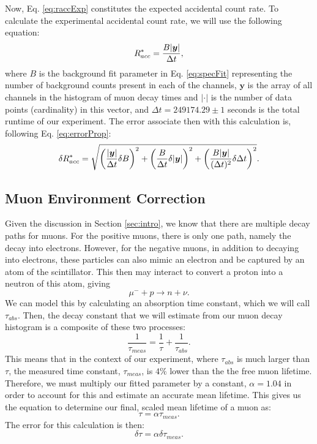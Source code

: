 \documentclass[
    aps, 
    twocolumn, 
    secnumarabic, 
    balancelastpage, 
    amsmath, 
    amssymb, 
    nofootinbib, 
    floatfix
]{revtex4-2}
\begin{document}
Now, Eq. \eqref{eq:raccExp} constitutes the expected accidental count rate. To calculate the experimental accidental count rate, we will use the following equation:
\begin{equation}
	R_{acc}^{\**} = \dfrac{B\lvert \bm{y} \rvert}{\Delta t},
	\label{eq:raccAsc}
\end{equation}
where $B$ is the background fit parameter in Eq. \eqref{eq:specFit} representing the number of background counts present in each of the channels, $\bm{y}$ is the array of all channels in the histogram of muon decay times and $\lvert \cdot \rvert$ is the number of data points (cardinality) in this vector, and $\Delta t = 249174.29 \pm 1$ seconds is the total runtime of our experiment. The error associate then with this calculation is, following Eq. \eqref{eq:errorProp}:
\begin{equation}
	\delta R_{acc}^{\**} = \sqrt{\left(\dfrac{\lvert\bm{y}\rvert}{\Delta t} \delta B\right)^2 + \left(\dfrac{B}{\Delta t} \delta\lvert\bm{y}\rvert\right)^2 + \left(\dfrac{B\lvert\bm{y}\rvert}{(\Delta t)^2} \delta\Delta t\right)^2}.
	\label{eq:raccAscErr}
\end{equation}

\subsection{Muon Environment Correction}
\label{sec:muonCorrect}

Given the discussion in Section \ref{sec:intro}, we know that there are multiple decay paths for muons. For the positive muons, there is only one path, namely the decay into electrons. However, for the negative muons, in addition to decaying into electrons, these particles can also mimic an electron and be captured by an atom of the scintillator. This then may interact to convert a proton into a neutron of this atom, giving
\begin{equation}
	\mu^-+p\rightarrow n+\nu.
\end{equation}
We can model this by calculating an absorption time constant, which we will call $\tau_{abs}$. Then, the decay constant that we will estimate from our muon decay histogram is a composite of these two processes: 
\begin{equation}
	\dfrac{1}{\tau_{meas} }= \dfrac{1}{\tau} + \dfrac{1}{\tau_{abs}}.
\end{equation}
This means that in the context of our experiment, where $\tau_{abs}$ is much larger than $\tau$, the measured time constant, $\tau_{meas}$, is $4\%$ lower than the the free muon lifetime. Therefore, we must multiply our fitted parameter by a constant, $\alpha = 1.04$ in order to account for this and estimate an accurate mean lifetime. This gives us the equation to determine our final, scaled mean lifetime of a muon as:
\begin{equation}
	\tau = \alpha\tau_{meas}.
	\label{eq:tauCorrect}
\end{equation}
The error for this calculation is then:
\begin{equation}
	\delta \tau = \alpha \delta \tau_{meas}.
	\label{eq:tauCorrectError}
\end{equation}
\end{document}
